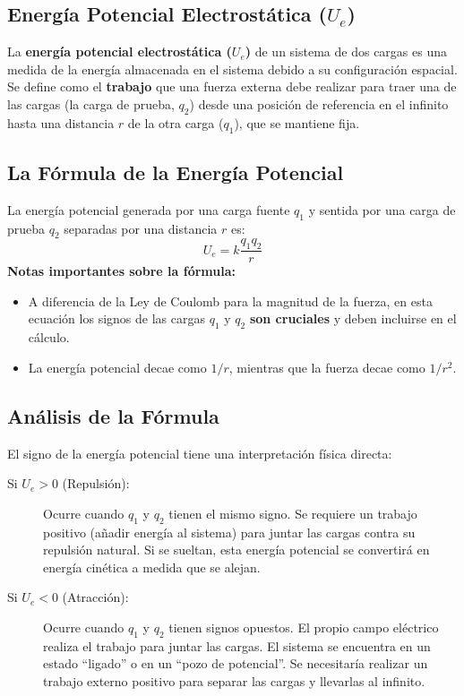 \documentclass[11pt,a4paper]{book}
\begin{document}
\subsection{Energía Potencial Electrostática ($U_e$)}

La \textbf{energía potencial electrostática ($U_e$)} de un sistema de dos cargas es una medida de la energía almacenada en el sistema debido a su configuración espacial. Se define como el \textbf{trabajo} que una fuerza externa debe realizar para traer una de las cargas (la carga de prueba, $q_2$) desde una posición de referencia en el infinito hasta una distancia $r$ de la otra carga ($q_1$), que se mantiene fija.

\subsection*{La Fórmula de la Energía Potencial}
La energía potencial generada por una carga fuente $q_1$ y sentida por una carga de prueba $q_2$ separadas por una distancia $r$ es:
\begin{equation}
    \boxed{
    U_e = k \frac{q_1 q_2}{r}
    }
    \label{eq:energia_potencial_e}
\end{equation}
\textbf{Notas importantes sobre la fórmula:}
\begin{itemize}
    \item A diferencia de la Ley de Coulomb para la magnitud de la fuerza, en esta ecuación los signos de las cargas $q_1$ y $q_2$ \textbf{son cruciales} y deben incluirse en el cálculo.
    \item La energía potencial decae como $1/r$, mientras que la fuerza decae como $1/r^2$.
\end{itemize}

\subsection*{Análisis de la Fórmula}
El signo de la energía potencial tiene una interpretación física directa:
\begin{description}
    \item[Si $U_e > 0$ (Repulsión):] Ocurre cuando $q_1$ y $q_2$ tienen el mismo signo. Se requiere un trabajo positivo (añadir energía al sistema) para juntar las cargas contra su repulsión natural. Si se sueltan, esta energía potencial se convertirá en energía cinética a medida que se alejan.

    \item[Si $U_e < 0$ (Atracción):] Ocurre cuando $q_1$ y $q_2$ tienen signos opuestos. El propio campo eléctrico realiza el trabajo para juntar las cargas. El sistema se encuentra en un estado ``ligado'' o en un ``pozo de potencial''. Se necesitaría realizar un trabajo externo positivo para separar las cargas y llevarlas al infinito.
\end{description}
\end{document}
